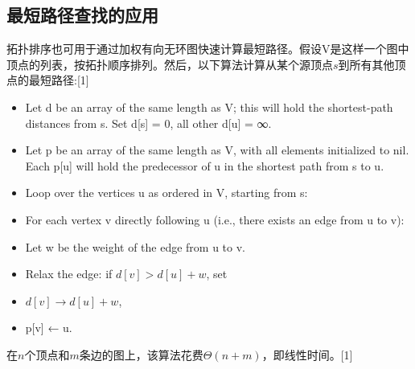 \subsection{最短路径查找的应用}
拓扑排序也可用于通过加权有向无环图快速计算最短路径。假设V是这样一个图中顶点的列表，按拓扑顺序排列。然后，以下算法计算从某个源顶点$s$到所有其他顶点的最短路径:[1]
\begin{itemize}
\item Let d be an array of the same length as V; this will hold the shortest-path distances from s. Set d[s] = 0, all other d[u] = ∞.
\item Let p be an array of the same length as V, with all elements initialized to nil. Each p[u] will hold the predecessor of u in the shortest path from s to u.
\item Loop over the vertices u as ordered in V, starting from s:
\item For each vertex v directly following u (i.e., there exists an edge from u to v):
\item Let w be the weight of the edge from u to v.
\item Relax the edge: if $d[v] > d[u] + w$, set
\item $d[v] \to d[u] + w$,
\item p[v] ← u.
\end{itemize}
在$n$个顶点和$m$条边的图上，该算法花费$\Theta(n + m)$，即线性时间。[1]